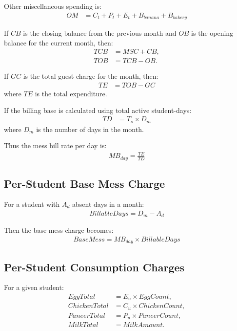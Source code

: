 \documentclass[conference]{IEEEtran}
\begin{document}
Other miscellaneous spending is:
\begin{align}
OM &= C_t + P_t + E_t + B_{banana} + B_{bakery}
\end{align}

If \(CB\) is the closing balance from the previous month and \(OB\) is the opening balance for the current month, then:
\begin{align}
TCB &= MSC + CB, \\
TOB &= TCB - OB.
\end{align}

If \(GC\) is the total guest charge for the month, then:
\begin{align}
TE &= TOB - GC
\end{align}
where \(TE\) is the total expenditure.

If the billing base is calculated using total active student-days:
\begin{align}
TD &= T_s \times D_m
\end{align}
where \(D_m\) is the number of days in the month.

Thus the mess bill rate per day is:
\begin{align}
MB_{day} = \frac{TE}{TD}
\end{align}

\subsection{Per-Student Base Mess Charge}
For a student with \(A_d\) absent days in a month:
\begin{align}
BillableDays = D_m - A_d
\end{align}

Then the base mess charge becomes:
\begin{align}
BaseMess = MB_{day} \times BillableDays
\end{align}

\subsection{Per-Student Consumption Charges}
For a given student:
\begin{align}
EggTotal &= E_u \times EggCount, \\
ChickenTotal &= C_u \times ChickenCount, \\
PaneerTotal &= P_u \times PaneerCount, \\
MilkTotal &= MilkAmount.
\end{align}
\end{document}
